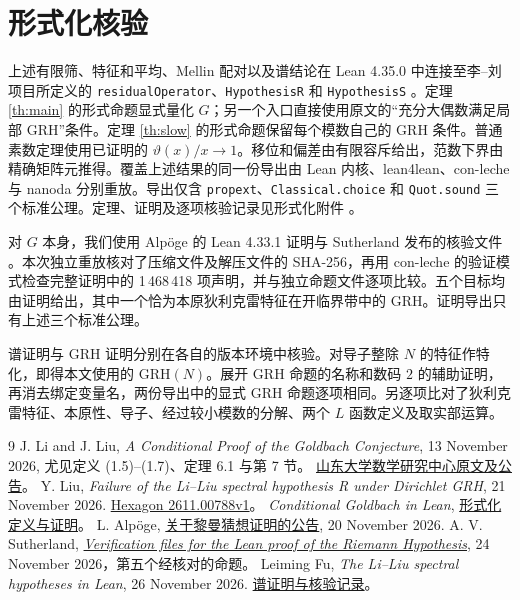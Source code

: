 \documentclass[UTF8,a4paper,11pt,fontset=fandol]{ctexart}
\newcommand{\GRH}{\mathrm{GRH}}
\begin{document}
\clearpage
\section*{形式化核验}
上述有限筛、特征和平均、Mellin 配对以及谱结论在 Lean 4.35.0 中连接至李--刘项目所定义的 \texttt{residualOperator}、\texttt{HypothesisR} 和 \texttt{HypothesisS} \cite{LLLean}。定理 \ref{th:main} 的形式命题显式量化 \(G\)；另一个入口直接使用原文的“充分大偶数满足局部 GRH”条件。定理 \ref{th:slow} 的形式命题保留每个模数自己的 GRH 条件。普通素数定理使用已证明的 \(\vartheta(x)/x\to1\)。移位和偏差由有限容斥给出，范数下界由精确矩阵元推得。覆盖上述结果的同一份导出由 Lean 内核、lean4lean、con-leche 与 nanoda 分别重放。导出仅含 \texttt{propext}、\texttt{Classical.choice} 和 \texttt{Quot.sound} 三个标准公理。定理、证明及逐项核验记录见形式化附件 \cite{ThisLean}。

对 \(G\) 本身，我们使用 Alpöge 的 Lean 4.33.1 证明与 Sutherland 发布的核验文件 \cite{GRH}。本次独立重放核对了压缩文件及解压文件的 SHA-256，再用 con-leche 的验证模式检查完整证明中的 1\,468\,418 项声明，并与独立命题文件逐项比较。五个目标均由证明给出，其中一个恰为本原狄利克雷特征在开临界带中的 GRH。证明导出只有上述三个标准公理。

谱证明与 GRH 证明分别在各自的版本环境中核验。对导子整除 \(N\) 的特征作特化，即得本文使用的 \(\GRH(N)\)。展开 GRH 命题的名称和数码 \(2\) 的辅助证明，再消去绑定变量名，两份导出中的显式 GRH 命题逐项相同。另逐项比对了狄利克雷特征、本原性、导子、经过较小模数的分解、两个 \(L\) 函数定义及取实部运算。

\begin{thebibliography}{9}
 J. Li and J. Liu, \textit{A Conditional Proof of the Goldbach Conjecture},
13 November 2026, 尤见定义 (1.5)--(1.7)、定理 6.1 与第 7 节。
\href{https://mrc.sdu.edu.cn/english/info/1018/1514.htm}{山东大学数学研究中心原文及公告}。
 Y. Liu, \textit{Failure of the Li--Liu spectral hypothesis R under Dirichlet GRH},
21 November 2026. \href{https://hexagonmath.org/2611.00788v1}{Hexagon 2611.00788v1}。
 \textit{Conditional Goldbach in Lean},
\href{https://github.com/subfish-zhou/conditional-goldbach-lean}{形式化定义与证明}。
 L. Alpöge, \href{https://alpo.ge/remark.pdf}{关于黎曼猜想证明的公告}, 20 November 2026.
A. V. Sutherland, \href{https://math.mit.edu/~drew/grh/}{\textit{Verification files for the Lean proof of the Riemann Hypothesis}},
24 November 2026，第五个经核对的命题。
 Leiming Fu, \textit{The Li--Liu spectral hypotheses in Lean}, 26 November 2026.
\href{https://github.com/RaymondVoldemortFu/li-liu-spectral-hypotheses-lean}{谱证明与核验记录}。
\end{thebibliography}
\end{document}
